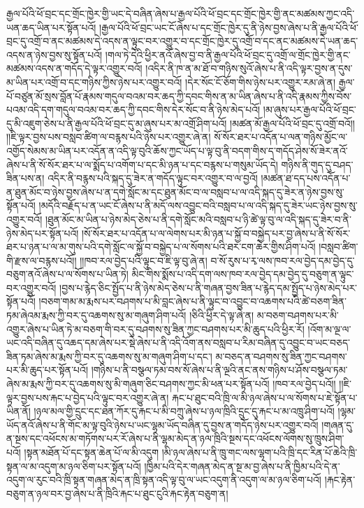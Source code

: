 རྒྱལ་པོའི་ཕོ་བྲང་དང་གྲོང་ཁྱེར་གྱི་ཡང་དེ་བཞིན་ཞེས་པ་རྒྱལ་པོའི་ཕོ་བྲང་དང་གྲོང་ཁྱེར་གྱི་ནང་མཚམས་ཀྱང་འདི་ཡན་ཆད་ཡིན་པར་སྟོན་པའོ། །རྒྱལ་པོའི་ཕོ་བྲང་ཡང་ངོ་ཞེས་པ་དང་གྲོང་ཁྱེར་དུ་ནི་ཉེས་བྱས་ཞེས་པ་ནི་རྒྱལ་པོའི་ཕོ་བྲང་དུ་འགྲོ་བ་ནང་མཚམས་དེ་འདས་ན་ལྟུང་བར་འགྱུར་བ་དང་གྲོང་ཁྱེར་དུ་འགྲོ་བ་དང་ནང་མཚམས་དེ་ཡན་ཆད་འདས་ན་ཉེས་བྱས་སུ་སྟོན་པའོ། །གལ་ཏེ་དེའི་ཕྱིར་ནའོ་ཞེས་བྱ་བ་ནི་རྒྱལ་པོའི་ཕོ་བྲང་དུ་འགྲོ་ལ་གྲོང་ཁྱེར་གྱི་ནང་མཚམས་འདས་ན་གདོད་དེ་ལྟར་འགྱུར་བའོ། །འདིར་ནི་ཁ་ན་མ་ཐོ་བ་གཉིས་སུའོ་ཞེས་པ་ནི་འདི་ལྟར་བྱས་ན་དུས་མ་ཡིན་པར་འགྲོ་བ་དང་གཉིས་ཀྱིས་ཉེས་པར་འགྱུར་བའོ། །དེར་སོང་ངོ་ཅོག་གིས་ཉེས་པར་འགྱུར་རམ་ཞེ་ན། རྒྱལ་པོ་བཙུན་མོ་སྲས་བློན་པོ་རྣམས་གདུལ་བའམ་བར་ཆད་ཀྱི་དབང་གིས་ན་མ་ཡིན་ཞེས་པ་ནི་འདི་རྣམས་ཀྱིས་བོས་པའམ་འདི་དག་གདུལ་བའམ་བར་ཆད་ཀྱི་དབང་གིས་དེར་སོང་བ་ནི་ཉེས་མེད་པའོ། །མ་ཞུས་པར་རྒྱལ་པོའི་ཕོ་བྲང་དུ་མི་འཇུག་ཅེས་པ་ནི་རྒྱལ་པོའི་ཕོ་བྲང་དུ་མ་ཞུས་པར་མ་འགྲོ་ཤིག་པའོ། །མཚན་མོ་རྒྱལ་པོའི་ཕོ་བྲང་དུ་འགྲོ་བའོ།། །།ཇི་ལྟར་བྱས་པས་བསླབ་ཚིག་ལ་བརྙས་པའི་ཉེས་པར་འགྱུར་ཞེ་ན། སོ་སོར་ཐར་པ་འདོན་པ་ལན་གཉིས་མྱོང་ལ་འགྱོད་སེམས་མ་ཡིན་པར་འདོན་ན་འདི་ལྟ་བུའི་ཆོས་ཀྱང་ཡོད་པ་ལྟ་བུ་ནི་བདག་གིས་ད་གདོད་ཤེས་སོ་ཟེར་ནའོ་ཞེས་པ་ནི་སོ་སོར་ཐར་པ་ལ་སྨོད་པ་འགོག་པ་དང་མི་ཉན་པ་དང་བརྙས་པ་གསུམ་ཡོད་དེ། གཉིས་ནི་གུད་དུ་བཤད་ཟིན་པས་ན། འདིར་ནི་བརྙས་པའི་སྐད་དུ་ཟེར་ན་གདོད་ལྟུང་བར་འགྱུར་བ་ལ་བྱའོ། །མཚན་ཐ་དད་པས་འདོན་པ་ན་ཐུན་མོང་བ་ཉེས་བྱས་ཞེས་པ་ན་དགེ་སློང་མ་དང་ཐུན་མོང་བ་ལ་བསླབ་པ་ལ་འདི་སྐད་དུ་ཟེར་ན་ཉེས་བྱས་སུ་སྟོན་པའོ། །མདོའི་བརྗོད་པ་ན་ཡང་ངོ་ཞེས་པ་ནི་མདོ་ལས་འབྱུང་བའི་བསླབ་པ་ལ་འདི་སྐད་དུ་ཟེར་ཡང་ཉེས་བྱས་སུ་འགྱུར་བའོ། །ཐུན་མོང་མ་ཡིན་པ་ཉེས་མེད་ཅེས་པ་ནི་དགེ་སློང་མའི་བསླབ་པ་ཉི་ཚེ་ལྟ་བུ་ལ་འདི་སྐད་དུ་ཟེར་བ་ནི་ཉེས་མེད་པར་སྟོན་པའོ། །སོ་སོར་ཐར་པ་འདོན་པ་ལ་ལེགས་པར་མི་ཉན་པ་སྐྱོ་བ་བསྐྱེད་པར་བྱ་ཞེས་པ་ནི་སོ་སོར་ཐར་པ་ཉན་པ་ལ་མ་གུས་པའི་དགེ་སློང་ལ་སྐྱོ་བ་བསྐྱེད་པ་ལ་སོགས་པའི་ཐར་ངག་ཆེར་གྱིས་ཤིག་པའོ། །བསླབ་ཚིག་གི་རྫས་ལ་བརྙས་པའོ།། །།ཁབ་རལ་བྱེད་པའི་ལྟུང་བ་ཇི་ལྟ་བུ་ཞེ་ན། བ་སོ་རུས་པ་རྭ་ལས་ཁབ་རལ་བྱེད་དམ་བྱེད་དུ་བཅུག་ནའོ་ཞེས་པ་ལ་སོགས་པ་ཡིན་ཏེ། མིང་གིས་སྨོས་པ་འདི་དག་ལས་ཁབ་རལ་བྱེད་དམ་བྱེད་དུ་བཅུག་ན་ལྟུང་བར་འགྱུར་བའོ། །བྱས་པ་རྙེད་ཅིང་སྤྱོད་པ་ནི་ཉེས་མེད་ཅེས་པ་ནི་གཞན་བྱས་ཟིན་པ་རྙེད་དམ་སྤྱོད་པ་ཉེས་མེད་པར་སྟོན་པའོ། །བཅག་གམ་མ་རྨས་པར་བཤགས་པ་མི་བླང་ཞེས་པ་ནི་ལྟུང་བ་འབྱུང་བ་འཆགས་པའི་ཚེ་བཅག་ཟིན་ཏམ་ཞེའམ་རྨས་ཀྱི་བར་དུ་འཆགས་སུ་མ་གཞུག་ཤིག་པའོ། །ཅིའི་ཕྱིར་དེ་ལྟ་ཞེ་ན། མ་བཅག་བཤགས་པར་མི་འགྱུར་ཞེས་པ་ཡིན་ཏེ་མ་བཅག་གི་བར་དུ་བཤགས་སུ་ཟིན་ཀྱང་བཤགས་པར་མི་ཆུད་པའི་ཕྱིར་རོ། །འོག་མ་ལྔ་ལ་ཡང་འདི་བཞིན་དུ་འཆད་དམ་ཞེས་པར་སྡེ་ཞེས་པ་ནི་འདི་འོག་ནས་བསླབ་པ་རིམ་བཞིན་དུ་འབྱུང་བ་ཡང་བཅད་ཟིན་ཏམ་ཞེས་མ་རྨས་ཀྱི་བར་དུ་འཆགས་སུ་མ་གཞུག་ཤིག་པ་དང་། མ་བཅད་ན་བཤགས་སུ་ཟིན་ཀྱང་བཤགས་པར་མི་ཆུད་པར་སྟོན་པའོ། །གཉིས་པ་ནི་བསྩལ་ཏམ་བས་སོ་ཞེས་པ་ནི་ལྔའི་ནང་ནས་གཉིས་པ་ཤོས་བསྩལ་ཏམ་ཞེས་མ་རྨས་ཀྱི་བར་དུ་འཆགས་སུ་མི་གཞུག་ཅིང་བཤགས་ཀྱང་མི་ཕན་པར་སྟོན་པའོ། །ཁབ་རལ་བྱེད་པའོ།། །།ཇི་ལྟར་བྱས་པས་རྐང་པ་བྱེད་པའི་ལྟུང་བར་འགྱུར་ཞེ་ན། རྐང་པ་ཐུང་བའི་ཁྲི་ལ་མི་ཉལ་ཞེས་པ་ལ་སོགས་པ་ཇེ་སྟོན་པ་ཡིན་ནོ། །ཉལ་མལ་གྱི་དྲུང་དང་ཐན་ཀོར་དུ་རྐང་པ་མི་བཀྲུ་ཞེས་པ་ཉལ་ཁྲིའི་དྲུང་དུ་རྐང་པ་མ་འཁྲུ་ཤིག་པའོ། །ལྷམ་ཡོད་ནའོ་ཞེས་པ་ནི་གོང་མ་ལྟ་བུའི་ཉེས་པ་ཡང་ལྷམ་ཡོད་བཞིན་དུ་བྱས་ན་གདོད་ཉེས་པར་འགྱུར་བའོ། །གཞན་དུ་ན་སྔས་དང་འཕོངས་མ་གཏོགས་པར་རོ་ཞེས་པ་ནི་ལྷམ་མེད་ན་ཉལ་ཁྲིའི་སྔས་དང་འཕོངས་ལོགས་སུ་ཁྲུས་ཤིག་པའོ། །སྟན་མཐོན་པོ་དང་སྟན་ཆེན་པོ་ལ་མི་འདུག །མི་ཉལ་ཞེས་པ་ནི་ཁྲུ་གང་ལས་ལྷག་པའི་ཁྲི་དང་རིན་པོ་ཆེའི་ཁྲི་སྟན་ལ་མ་འདུག་མ་ཉལ་ཅིག་པར་སྟོན་པའོ། །ཁྱིམ་པའི་དེར་གཞན་མེད་ན་སྔ་མ་བྱ་ཞེས་པ་ནི་ཁྱིམ་པའི་དེ་ན་འདུག་ལ་རུང་བའི་ཁྲི་སྟན་གཞན་མེད་ན་ཁྲི་སྟན་འདི་ལྟ་བུ་ལ་ཡང་འདུག་ནི་འདུག་ལ་མ་ཉལ་ཅིག་པའོ། །རྐང་རྟེན་བཅུག་ན་ཉལ་བར་བྱ་ཞེས་པ་ནི་ཁྲིའི་རྐང་པ་ཐུང་ངུའི་རྐང་རྟེན་བཅུག་ན། 